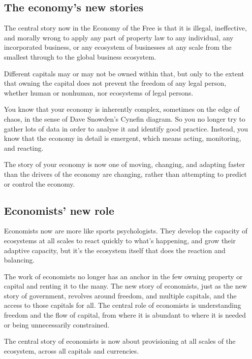 \subsection{The economy's new stories}
The central story now in the Economy of the Free is that it is illegal, ineffective, and morally wrong to apply any part of property law to any individual, any incorporated business, or any ecosystem of businesses at any scale from the smallest through to the global business ecosystem. 


Different capitals may or may not be owned within that, but only to the extent that owning the capital does not prevent the freedom of any legal person, whether human or nonhuman, nor ecosystems of legal persons.


You know that your economy is inherently complex, sometimes on the edge of chaos, in the sense of Dave Snowden's  Cynefin\cite{snowden-cynefin, cynefin} diagram. So you no longer try to gather lots of data in order to analyse it and identify good practice. Instead, you know that the economy in detail is emergent, which means acting, monitoring, and reacting. 


The story of your economy is now one of moving, changing, and adapting faster than the drivers of the economy are changing, rather than attempting to predict or control the economy.




\subsection{Economists' new role}
Economists  now are more like sports psychologists. They develop the capacity of ecosystems at all scales to react quickly to what's happening, and grow their adaptive capacity, but it's the ecosystem itself that does the reaction and balancing.


The work of economists no longer has an anchor in the few owning property or capital and renting it to the many. The new story of economists, just as the new story of government,  revolves around freedom, and multiple capitals, and the access to those capitals for all. The central role of economists is understanding freedom and the flow of capital, from where it is abundant to where it is needed or being unnecessarily constrained.


The central story of economists is now about provisioning at all scales of the ecosystem, across all capitals and currencies. 


